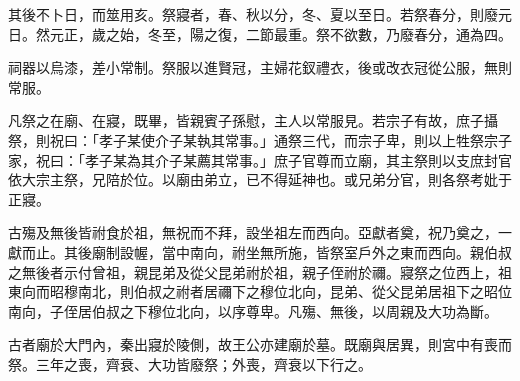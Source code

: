 \begin{pinyinscope}
 其後不卜日，而筮用亥。祭寢者，春、秋以分，冬、夏以至日。若祭春分，則廢元日。然元正，歲之始，冬至，陽之復，二節最重。祭不欲數，乃廢春分，通為四。



 祠器以烏漆，差小常制。祭服以進賢冠，主婦花釵禮衣，後或改衣冠從公服，無則常服。



 凡祭之在廟、在寢，既畢，皆親賓子孫慰，主人以常服見。若宗子有故，庶子攝祭，則祝曰：「孝子某使介子某執其常事。」通祭三代，而宗子卑，則以上牲祭宗子家，祝曰：「孝子某為其介子某薦其常事。」庶子官尊而立廟，其主祭則以支庶封官依大宗主祭，兄陪於位。以廟由弟立，已不得延神也。或兄弟分官，則各祭考妣于正寢。



 古殤及無後皆祔食於祖，無祝而不拜，設坐祖左而西向。亞獻者奠，祝乃奠之，一獻而止。其後廟制設幄，當中南向，祔坐無所施，皆祭室戶外之東而西向。親伯叔之無後者示付曾祖，親昆弟及從父昆弟祔於祖，親子侄祔於禰。寢祭之位西上，祖東向而昭穆南北，則伯叔之祔者居禰下之穆位北向，昆弟、從父昆弟居祖下之昭位南向，子侄居伯叔之下穆位北向，以序尊卑。凡殤、無後，以周親及大功為斷。



 古者廟於大門內，秦出寢於陵側，故王公亦建廟於墓。既廟與居異，則宮中有喪而祭。三年之喪，齊衰、大功皆廢祭；外喪，齊衰以下行之。



\end{pinyinscope}